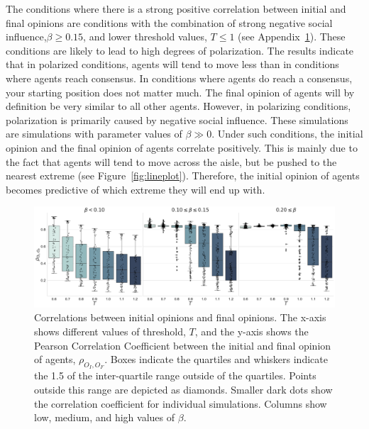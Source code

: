 \documentclass[11pt]{article}
\begin{document}
The conditions where there is a strong positive correlation between initial and final opinions are conditions with the combination of strong negative social influence,$\beta \geq 0.15$, and lower threshold values, $T \leq 1$ (see Appendix~\ref{appendix:corr_initial_final}). These conditions are likely to lead to high degrees of polarization. The results indicate that in polarized conditions, agents will tend to move less than in conditions where agents reach consensus. In conditions where agents do reach a consensus, your starting position does not matter much. The final opinion of agents will by definition be very similar to all other agents. However, in polarizing conditions, polarization is primarily caused by negative social influence. These simulations are simulations with parameter values of $\beta \gg 0$. Under such conditions, the initial opinion and the final opinion of agents correlate positively. This is mainly due to the fact that agents will tend to move across the aisle, but be pushed to the nearest extreme (see Figure~\ref{fig:lineplot}). Therefore, the initial opinion of agents becomes predictive of which extreme they will end up with. 

\begin{figure}[H]
    \centering
    \includegraphics[width=.8\linewidth]{../plots/overall/Correlation_Initial_Opinions.pdf}
  \caption{Correlations between initial opinions and final opinions. The x-axis shows different values of threshold, $T$, and the y-axis shows the Pearson Correlation Coefficient between the initial and final opinion of agents, $\rho_{O_I, O_F}$. Boxes indicate the quartiles and whiskers indicate the 1.5 of the inter-quartile range outside of the quartiles. Points outside this range are depicted as diamonds. Smaller dark dots show the correlation coefficient for individual simulations. Columns show low, medium, and high values of $\beta$. }
  \label{appendix:corr_initial_final}
\end{figure}
\end{document}
